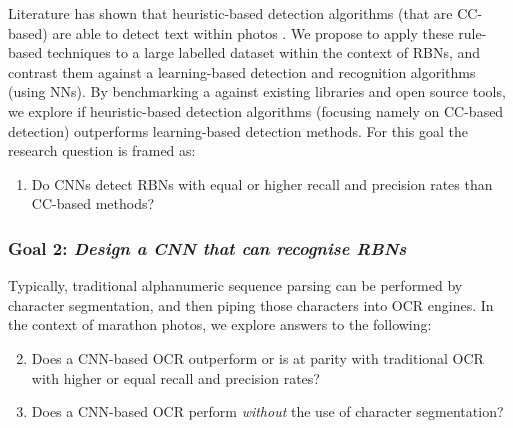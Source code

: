 Literature has shown that heuristic-based detection algorithms (that are CC-based) are able to detect text within photos \citep{Li:2012wd, Chen:2011ul, Eichner:2008dw} . We propose to apply these rule-based techniques to a large labelled dataset within the context of RBNs, and contrast them against a learning-based detection and recognition algorithms (using NNs). By benchmarking a against existing libraries and open source tools, we explore if heuristic-based detection algorithms (focusing namely on CC-based detection) outperforms learning-based detection methods. 
For this goal the research question is framed as:
\begin{enumerate}[label=\bfseries~RQ\arabic*), leftmargin=2cm, rightmargin=1.5cm]
  \item\label{rq:1} Do CNNs detect RBNs with equal or higher recall and precision rates than CC-based methods?
\end{enumerate}

\subsubsection*{Goal 2: \itshape Design a CNN that can recognise RBNs}

Typically, traditional alphanumeric sequence parsing can be performed by character segmentation, and then piping those characters into OCR engines.
In the context of marathon photos, we explore answers to the following:
\begin{enumerate}[label=\bfseries~RQ\arabic*), leftmargin=2cm, rightmargin=1.5cm]
  \setcounter{enumi}{1}
  \item\label{rq:2} Does a CNN-based OCR outperform or is at parity with traditional OCR with higher or equal recall and precision rates?
  \item\label{rq:3} Does a CNN-based OCR perform \textit{without} the use of character segmentation?
\end{enumerate}

